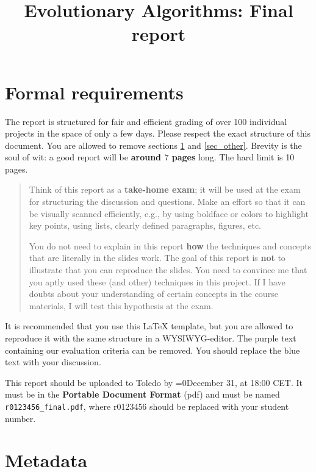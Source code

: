 \documentclass[a4paper,10pt]{article}
\title{Evolutionary Algorithms: Final report}
\author{\ReplaceMe{Your Name (r0123456)}}
\def\retake{0}
\newcommand{\switch}[2]{\ifnum\retake=0{#1}\else{#2}\fi}
\newcommand{\thisyear}{\the\year}
\newcommand{\deadlineCode}{\switch{December 31, \thisyear{} at 18:00 CET}{August 14, \thisyear{} at 18:00 CET}}
\newcommand{\deadlineReport}{\deadlineCode}
\newcommand{\RemoveMe}[1]{{\color{purple}#1}}
\begin{document}
\selectfont{}

\maketitle

\section{\RemoveMe{Formal requirements}}\label{sec_this}

\RemoveMe{The report is structured for fair and efficient grading of over 100 individual projects in the space of only a few days. Please respect the exact structure of this document. You are allowed to remove sections \ref{sec_this} and \ref{sec_other}. Brevity is the soul of wit: a good report will be \textbf{around $7$ pages} long. The hard limit is 10 pages. 

\begin{quote}
Think of this report as a \textbf{take-home exam}; it will be used at the exam for structuring the discussion and questions. Make an effort so that it can be visually scanned efficiently, e.g., by using boldface or colors to highlight key points, using lists, clearly defined paragraphs, figures, etc.

You do not need to explain in this report \textbf{how} the techniques and concepts that are literally in the slides work. The goal of this report is \textbf{not} to illustrate that you can reproduce the slides. You need to convince me that you aptly used these (and other) techniques in this project. If I have doubts about your understanding of certain concepts in the course materials, I will test this hypothesis at the exam.
\end{quote}

It is recommended that you use this \LaTeX{} template, but you are allowed to reproduce it with the same structure in a WYSIWYG-editor. The purple text containing our evaluation criteria can be removed. You should replace the blue text with your discussion.

This report should be uploaded to Toledo by \deadlineReport. It must be in the \textbf{Portable Document Format} (pdf) and must be named \texttt{r0123456\_final.pdf}, where r0123456 should be replaced with your student number.}

\section{Metadata}
\end{document}
